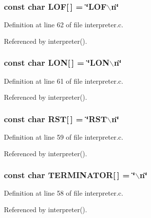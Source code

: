 \subsubsection{\setlength{\rightskip}{0pt plus 5cm}const char {\bf LOF}[$\,$] = \char`\"{}LOF$\backslash$n\char`\"{}}\label{interpreter_8c_a5}




Definition at line 62 of file interpreter.c.

Referenced by interpreter().
\subsubsection{\setlength{\rightskip}{0pt plus 5cm}const char {\bf LON}[$\,$] = \char`\"{}LON$\backslash$n\char`\"{}}\label{interpreter_8c_a4}




Definition at line 61 of file interpreter.c.

Referenced by interpreter().
\subsubsection{\setlength{\rightskip}{0pt plus 5cm}const char {\bf RST}[$\,$] = \char`\"{}RST$\backslash$n\char`\"{}}\label{interpreter_8c_a2}




Definition at line 59 of file interpreter.c.

Referenced by interpreter().
\subsubsection{\setlength{\rightskip}{0pt plus 5cm}const char {\bf TERMINATOR}[$\,$] = \char`\"{}$\backslash$n\char`\"{}}\label{interpreter_8c_a1}




Definition at line 58 of file interpreter.c.

Referenced by interpreter().